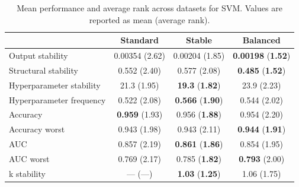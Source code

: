 \begin{table}
\caption{Mean performance and average rank across datasets for SVM. Values are reported as mean (average rank).}
\label{tab:svm_mean_performance_rank}
\begin{tabular}{lccc}
\toprule
 & Standard & Stable & Balanced \\
\midrule
Output stability & 0.00354 (2.62) & 0.00204 (1.85) & \textbf{0.00198} (\textbf{1.52}) \\
Structural stability & 0.552 (2.40) & 0.577 (2.08) & \textbf{0.485} (\textbf{1.52}) \\
Hyperparameter stability & 21.3 (1.95) & \textbf{19.3} (\textbf{1.82}) & 23.9 (2.23) \\
Hyperparameter frequency & 0.522 (2.08) & \textbf{0.566} (\textbf{1.90}) & 0.544 (2.02) \\
Accuracy & \textbf{0.959} (1.93) & 0.956 (\textbf{1.88}) & 0.954 (2.20) \\
Accuracy worst & 0.943 (1.98) & 0.943 (2.11) & \textbf{0.944} (\textbf{1.91}) \\
AUC & 0.857 (2.19) & \textbf{0.861} (\textbf{1.86}) & 0.854 (1.95) \\
AUC worst & 0.769 (2.17) & 0.785 (\textbf{1.82}) & \textbf{0.793} (2.00) \\
k stability & — (—) & \textbf{1.03} (\textbf{1.25}) & 1.06 (1.75) \\
\bottomrule
\end{tabular}
\end{table}
